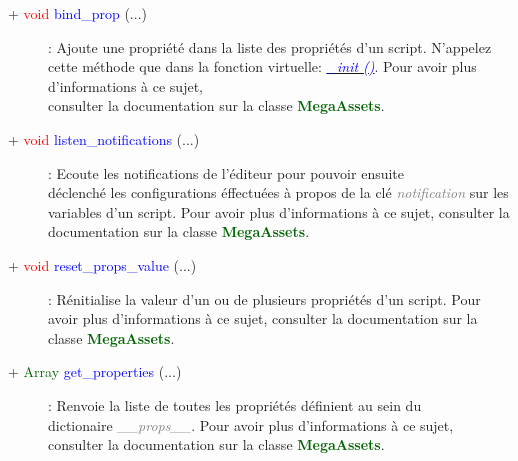\documentclass[a4paper, 11pt]{article}
\begin{document}
	\begin{description}
		\item [+ \textcolor{red}{void} \textcolor{blue}{bind\_prop} (...)]: Ajoute une propriété dans la
		liste des propriétés d'un script. N'appelez cette méthode que dans la fonction virtuelle:
		\href{https://docs.godotengine.org/en/stable/classes/class_object.html#class-object-method-init}
		{\textit{\textcolor{blue}{\_init ()}}}. Pour avoir plus d'informations à ce sujet, \\consulter la
		documentation sur la classe \textbf{\textcolor{darkgreen}{MegaAssets}}.\\
	\end{description}
	\begin{description}
		\item [+ \textcolor{red}{void} \textcolor{blue}{listen\_notifications} (...)]: Ecoute les
		notifications de l'éditeur pour pouvoir ensuite \\déclenché les configurations éffectuées à propos 
		de la clé \textit{\textcolor{gray}{notification}} sur les variables d'un script. Pour avoir plus
		d'informations à ce sujet, consulter la documentation sur la classe \textbf{\textcolor{darkgreen}
		{MegaAssets}}.\\
	\end{description}
	\begin{description}
		\item [+ \textcolor{red}{void} \textcolor{blue}{reset\_props\_value} (...)]: Rénitialise la valeur 
		d'un ou de plusieurs propriétés d'un script. Pour avoir plus d'informations à ce sujet, consulter la
		documentation sur la classe \textbf{\textcolor{darkgreen}{MegaAssets}}.\\
	\end{description}
	\begin{description}
		\item [+ \textcolor{darkgreen}{Array} \textcolor{blue}{get\_properties} (...)]: Renvoie la liste de 
		toutes les propriétés définient au sein du \\dictionaire \textit{\textcolor {gray}{\_\_props\_\_}}.
		Pour avoir plus d'informations à ce sujet, consulter la documentation sur la classe
		\textbf{\textcolor{darkgreen}{MegaAssets}}.\\
	\end{description}
\end{document}
